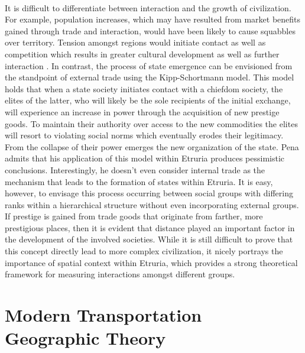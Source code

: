 \documentclass[12pt,a4paper]{thesis}
\begin{document}
\paragraph{}
It is difficult to differentiate between interaction and the growth of civilization. For example, population increases, which may have resulted from market benefits gained through trade and interaction, would have been likely to cause squabbles over territory. Tension amongst regions would initiate contact as well as competition which results in greater cultural development as well as further interaction \citep[234]{Ize07}. In contrast, the process of state emergence can be envisioned from the standpoint of external trade \citep{Pen11} using the Kipp-Schortmann model. This model holds that when a state society initiates contact with a chiefdom society, the elites of the latter, who will likely be the sole recipients of the initial exchange, will experience an increase in power through the acquisition of new prestige goods. To maintain their authority over access to the new commodities the elites will resort to violating social norms which eventually erodes their legitimacy.  From the collapse of their power emerges the new organization of the state. Pena admits that his application of this model within Etruria produces pessimistic conclusions. Interestingly, he doesn't even consider internal trade as the mechanism that leads to the formation of states within Etruria. It is easy, however, to envisage this process occurring between social groups with differing ranks within a hierarchical structure without even incorporating external groups. If prestige is gained from trade goods that originate from farther, more prestigious places, then it is evident that distance played an important factor in the development of the involved societies. While it is still difficult to prove that this concept directly lead to more complex civilization, it nicely portrays the importance of spatial context within Etruria, which provides a strong theoretical framework for measuring interactions amongst different groups. 

\section{Modern Transportation Geographic Theory}
\end{document}
